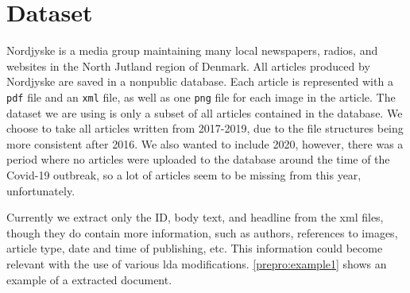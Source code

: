 \section{Dataset}\label{sec:dataset}
Nordjyske is a media group maintaining many local newspapers, radios, and websites in the North Jutland region of Denmark.
All articles produced by Nordjyske are saved in a nonpublic database.
Each article is represented with a \texttt{pdf} file and an \texttt{xml} file, as well as one \texttt{png} file for each image in the article.
The dataset we are using is only a subset of all articles contained in the database.
We choose to take all articles written from 2017-2019, due to the file structures being more consistent after 2016.
We also wanted to include 2020, however, there was a period where no articles were uploaded to the database around the time of the Covid-19 outbreak, so a lot of articles seem to be missing from this year, unfortunately.

Currently we extract only the ID, body text, and headline from the xml files, though they do contain more information, such as authors, references to images, article type, date and time of publishing, etc.
This information could become relevant with the use of various \gls{lda} modifications.
\autoref{prepro:example1} shows an example of a extracted document.
